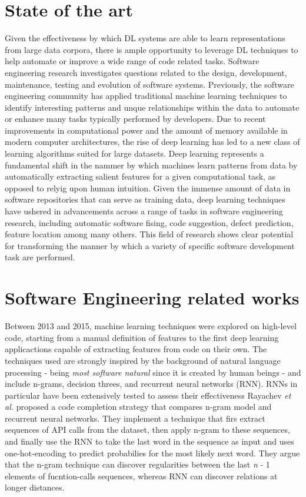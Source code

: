 \section{State of the art}
Given the effectiveness by which DL systems are able to learn representations from large data corpora, there is 
ample opportunity to leverage DL techniques to help automate or improve a wide range of code related tasks. 
Software engineering research investigates questions related to the design, development, maintenance, testing and evolution 
of software systems. Previously, the software engineering community has applied traditional machine learning 
techniques to identify interesting patterns and unque relationships within the data to automate or enhance many tasks typically 
performed by developers. Due to recent improvements in computational power and the amount of memory available 
in modern computer architectures, the rise of deep learning has led to a new class of learning algorithms suited for large datasets.
Deep learning represents a fundamental shift in the nammer by which machines learn patterns from data by automatically extracting salient features
for a given computational task, as opposed to relyig upon human intuition. Given the immense amount of data in software repositories that 
can serve as training data, deep learning techniques have ushered in advancements across a range of tasks in software engineering research, including
automatic software fising, code suggestion, defect prediction, feature location among many others. This field of research shows clear potential for
transforming the manner by which a variety of specific software development task are performed.

\section{Software Engineering related works}
Between 2013 and 2015, machine learning techniques were explored on high-level code, starting from a manual 
definition of features to the first deep learning applicactions capable of extracting features from code on their own.
The techniques used are strongly inspired by the background of natural language processing 
- being \textit{most software natural} \cite{hindle2016naturalness} since it is created by human beings - and include n-grams, decision threes, 
and recurrent neural networks (RNN). RNNs in particular have been extensively tested to assess their effectiveness
Rayachev \textit{et al.} \cite{raychev2014code} proposed a code completion strategy that compares n-gram model and recurrent neural networks. 
They implement a technique that firs extract sequences of API calls from the dataset, then apply n-gram to these sequences, and finally use the RNN 
to take the last word in the sequence as input and uses one-hot-encoding to predict probabilies for the most likely next word.
They argue that the n-gram technique can discover regularities between the last \textit{n} - 1 elements of fucntion-calls sequences, whereas RNN can discover
relations at longer distances.



